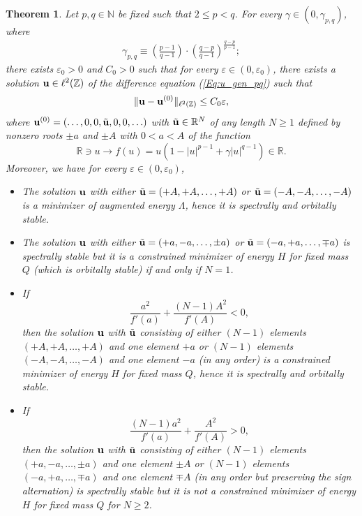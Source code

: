 \documentclass[12pt,reqno]{amsart}
\newtheorem{theorem}{Theorem}
\begin{document}
\begin{theorem}
	\label{th-main} 
	Let $p,q \in \mathbb{N}$ be fixed such that $2 \leq p < q$. For every $\gamma \in (0,\gamma_{{p,q}})$, where 
	 \begin{gather}
	\gamma_{{p,q}} \equiv \left(\frac{p-1}{q-1}\right)\cdot\left(\frac{q-p}{q-1}\right)^{\frac{q-p}{p-1}};\label{Eq:BoundGamma}
	\end{gather}
	there exists $\varepsilon_0 > 0$ and $C_0 > 0$ such that for every $\varepsilon \in (0,\varepsilon_0)$, there exists a solution ${\bf u} \in \ell^2(\mathbb{Z})$ of the difference equation (\ref{Eq:u_gen_pq}) such that 
	\begin{equation}
	\label{bound-ILMs}
	\| {\bf u} - {\bf u}^{(0)} \|_{\ell^2(\mathbb{Z})} \leq C_0 \varepsilon,
	\end{equation}	
where ${\bf u}^{(0)} = (\ldots,0,0,\tilde{\bf u},0,0,\ldots)$ with $\tilde{\bf u} \in \mathbb{R}^N$ of any length $N \geq 1$ defined by nonzero roots $\pm a$ and $\pm A$ with $0 < a  < A$ of the function 
\begin{equation}
\label{function}
\mathbb{R} \ni u \to f(u) = u (1 - |u|^{p-1} + \gamma |u|^{q-1}) \in \mathbb{R}.
\end{equation} 
Moreover, we have for every $\varepsilon \in (0,\varepsilon_0)$,
\begin{itemize}
	\item[(A)] The solution ${\bf u}$ with either
	$\tilde{\bf u} = (+A,+A,\dots, +A)$ or  $\tilde{\bf u} = (-A,-A,\dots,-A)$ is a minimizer of augmented energy $\Lambda$, hence it is spectrally and orbitally stable.

\item[(B)] The solution ${\bf u}$ with either 
$\tilde{\bf u} = (+a,-a,\dots,\pm a)$ or $\tilde{\bf u} = (-a,+a,\dots,\mp a)$ is spectrally stable but it is a constrained minimizer of energy $H$ for fixed mass $Q$ (which is orbitally stable) if and only if $N = 1$.  

\item[(C)] If 
\begin{equation}
\label{crit-1}
\frac{a^2}{f'(a)} + \frac{(N-1) A^2}{f'(A)} < 0,
\end{equation}
then the solution ${\bf u}$ with $\tilde{\bf u}$ consisting of either $(N-1)$ elements $(+A,+A,\dots,+A)$ and one element $+a$ or $(N-1)$ elements $(-A,-A,\dots,-A)$ and one element $-a$ (in any order) is a constrained minimizer of energy $H$ for fixed mass $Q$, hence it is spectrally and orbitally stable.

\item[(D)] If 
\begin{equation}
\label{crit-2}
\frac{(N-1) a^2}{f'(a)} + \frac{A^2}{f'(A)} > 0,
\end{equation}
then the solution ${\bf u}$ with $\tilde{\bf u}$ consisting of either $(N-1)$ elements  $(+a,-a,\dots,\pm a)$ and one element $\pm A$ or $(N-1)$ elements $(-a,+a,\dots,\mp a)$ and one element $\mp A$ (in any order but preserving the sign alternation) is spectrally stable but it is not a constrained minimizer of energy $H$ for fixed mass $Q$ for $N \geq 2$.
\end{itemize}
\end{theorem}
\end{document}
